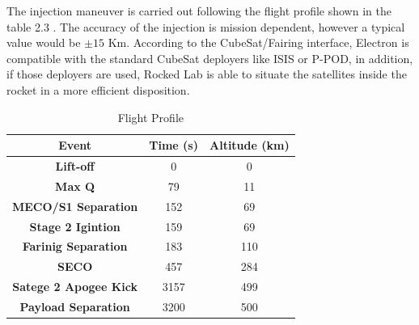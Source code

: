 The injection maneuver is carried out following the flight profile shown in the table 2.3 . The accuracy of the injection is mission dependent, however a typical value would be $\pm15$ Km. 
According to the CubeSat/Fairing interface, Electron is compatible with the standard CubeSat deployers like ISIS or P-POD, in addition, if those deployers are used, Rocked Lab is able to situate the satellites inside the rocket in a more efficient disposition.  
\newline	
	\begin{table}[h]
	\begin{center}
	\begin{tabular}{|c|c|c|}
	\hline
	 \bf{Event} & \bf{Time (s)} & \bf{Altitude (km)} \\
	\hline 
	\bf{Lift-off} & 0 & 0 \\
	\hline 
	\bf{Max Q} & 79 & 11 \\
	\hline 
	\bf{MECO/S1 Separation} & 152 & 69 \\
	\hline 
	\bf{Stage 2 Igintion} & 159 & 69 \\
	\hline 
	\bf{Farinig Separation} & 183 & 110 \\
	\hline 
	\bf{SECO} & 457 & 284 \\
	\hline 
	\bf{Satege 2 Apogee Kick} & 3157 & 499 \\
	\hline 
	\bf{Payload Separation} & 3200 & 500 \\
	\hline 
	\end{tabular}
	\end{center}
	\caption{Flight Profile}
	\end{table} 
\newline


